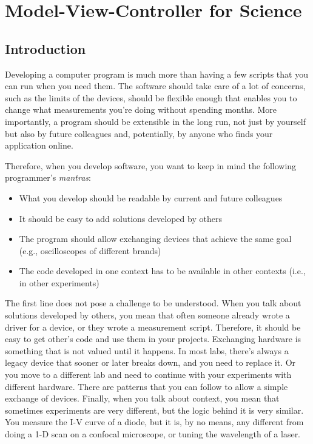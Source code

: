 \chapter{Model-View-Controller for Science}\label{ch:mvcs}

\section{Introduction}\label{sec:mvc-introduction}
Developing a computer program is much more than having a few scripts that you can run when you need them. The software should take care of a lot of concerns, such as the limits of the devices, should be flexible enough that enables you to change what measurements you're doing without spending months. More importantly, a program should be extensible in the long run, not just by yourself but also by future colleagues and, potentially, by anyone who finds your application online.

Therefore, when you develop software, you want to keep in mind the following programmer's \emph{mantras}:

\begin{itemize}
\item What you develop should be readable by current and future colleagues
\item It should be easy to add solutions developed by others
\item The program should allow exchanging devices that achieve the same goal (e.g., oscilloscopes of different brands)
\item The code developed in one context has to be available in other contexts (i.e., in other experiments)
\end{itemize}

The first line does not pose a challenge to be understood. When you talk about solutions developed by others, you mean that often someone already wrote a driver for a device, or they wrote a measurement script. Therefore, it should be easy to get other's code and use them in your projects. Exchanging hardware is something that is not valued until it happens. In most labs, there's always a legacy device that sooner or later breaks down, and you need to replace it. Or you move to a different lab and need to continue with your experiments with different hardware. There are patterns that you can follow to allow a simple exchange of devices. Finally, when you talk about context, you mean that sometimes experiments are very different, but the logic behind it is very similar. You measure the I-V curve of a diode, but it is, by no means, any different from doing a 1-D scan on a confocal microscope, or tuning the wavelength of a laser.


